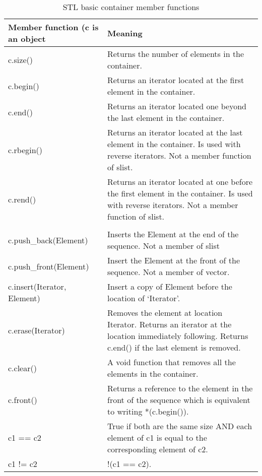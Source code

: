\begin{table}[H]
\begin{center}
\renewcommand{\arraystretch}{1.8}
\begin{tabular}{ m{4.5cm} m{11cm}} 
\textbf{Member function (c is an object} & \textbf{Meaning}\\
\hline

c.size() & Returns the number of elements in the container.\\
\hline

c.begin() & Returns an iterator located at the first element in the container.\\
\hline

c.end() & Returns an iterator located one beyond the last element in the container.\\
\hline

c.rbegin() & Returns an iterator located at the last element in the container. Is used
with reverse iterators. Not a member function of slist.\\
\hline

c.rend() & Returns an iterator located at one before the first element in the container. Is used
with reverse iterators. Not a member function of slist.\\\\
\hline

c.push\_back(Element) & Inserts the Element at the end of the sequence. Not a member of slist\\
\hline

c.push\_front(Element) & Insert the Element at the front of the sequence. Not a member of vector.\\
\hline

c.insert(Iterator, Element) & Insert a copy of Element before the location of `Iterator'.\\
\hline

c.erase(Iterator) & Removes the element at location Iterator. Returns an iterator at the
location immediately following. Returns c.end() if the last element is removed.\\
\hline

c.clear() & A void function that removes all the elements in the container.\\
\hline

c.front() & Returns a reference to the element in the front of the sequence which is equivalent
to writing *(c.begin()).\\
\hline

c1 == c2 & True if both are the same size AND each element of c1 is equal to the
corresponding element of c2.\\
\hline

c1 != c2 & !(c1 == c2).\\
\hline
\end{tabular}
\end{center}
\caption{STL basic container member functions}
\label{table_1}
\end{table}

